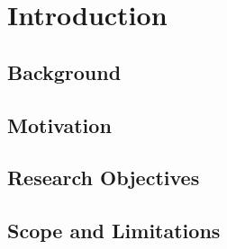 \clearpage

\chapter{Introduction}

\section{Background}
\section{Motivation}
\section{Research Objectives}
\section{Scope and Limitations}

\newpage
